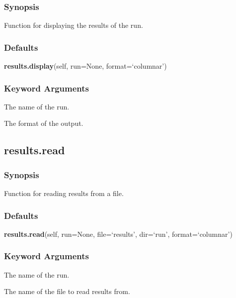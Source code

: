 \subsubsection{Synopsis}

Function for displaying the results of the run.



\subsubsection{Defaults}

\textsf{\textbf{results.display}(self, run=None, format=`columnar')}


\subsubsection{Keyword Arguments}

  The name of the run. 

  The format of the output. 





\newpage

\subsection{results.read}


\subsubsection{Synopsis}

Function for reading results from a file.



\subsubsection{Defaults}

\textsf{\textbf{results.read}(self, run=None, file=`results', dir=`run', format=`columnar')}


\subsubsection{Keyword Arguments}

  The name of the run. 

  The name of the file to read results from. 

